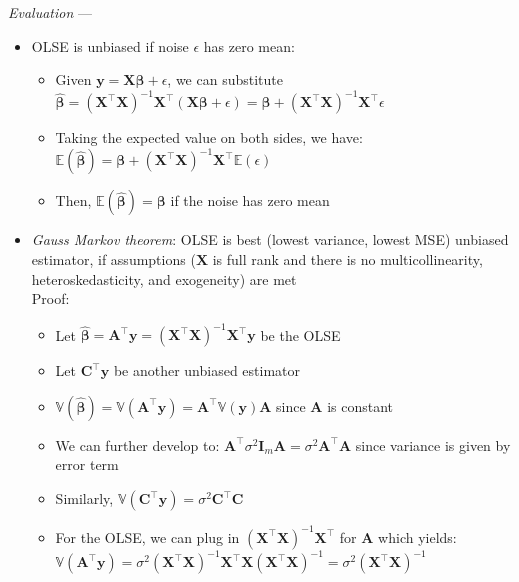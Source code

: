 \emph{Evaluation} ---
\begin{itemize}
    \item OLSE is unbiased if noise $\epsilon$ has zero mean:
    \begin{itemize}
        \item Given $\boldsymbol{y} = \boldsymbol{X}\boldsymbol{\beta} + \epsilon$, we can substitute $\boldsymbol{\hat{\beta}} = (\boldsymbol{X}^\intercal \boldsymbol{X})^{-1}  \boldsymbol{X}^\intercal (\boldsymbol{X}\boldsymbol{\beta} + \epsilon) = \boldsymbol{\beta} + (\boldsymbol{X}^\intercal \boldsymbol{X})^{-1}  \boldsymbol{X}^\intercal \epsilon$
        \item Taking the expected value on both sides, we have: $\mathbb{E}(\boldsymbol{\hat{\beta}}) = \boldsymbol{\beta} + (\boldsymbol{X}^\intercal \boldsymbol{X})^{-1}  \boldsymbol{X}^\intercal \mathbb{E}(\epsilon)$
        \item Then, $\mathbb{E}(\boldsymbol{\hat{\beta}}) = \boldsymbol{\beta}$ if the noise has zero mean
    \end{itemize}
    \item \emph{Gauss Markov theorem}: OLSE is best (lowest variance, lowest MSE) unbiased estimator, if assumptions ($\boldsymbol{X}$ is full rank and there is no multicollinearity, heteroskedasticity, and exogeneity) are met\\
    Proof:
    \begin{itemize}
        \item Let $\hat{\boldsymbol{\beta}} = \boldsymbol{A}^\intercal \boldsymbol{y} = (\boldsymbol{X}^\intercal \boldsymbol{X})^{-1}  \boldsymbol{X}^\intercal \boldsymbol{y}$ be the OLSE
        \item Let $\boldsymbol{C}^\intercal \boldsymbol{y}$ be another unbiased estimator
        \item $\mathbb{V}(\hat{\boldsymbol{\beta}}) = \mathbb{V}(\boldsymbol{A}^\intercal \boldsymbol{y}) = \boldsymbol{A}^\intercal \mathbb{V}(\boldsymbol{y}) \boldsymbol{A}$ since $\boldsymbol{A}$ is constant
        \item We can further develop to: $\boldsymbol{A}^\intercal \sigma^2 \boldsymbol{I}_m \boldsymbol{A} = \sigma^2 \boldsymbol{A}^\intercal \boldsymbol{A}$ since variance is given by error term
        \item Similarly, $\mathbb{V}(\boldsymbol{C}^\intercal \boldsymbol{y}) = \sigma^2 \boldsymbol{C}^\intercal \boldsymbol{C} $
        \item For the OLSE, we can plug in $(\boldsymbol{X}^\intercal \boldsymbol{X})^{-1}  \boldsymbol{X}^\intercal$ for $\boldsymbol{A}$ which yields: $\mathbb{V}(\boldsymbol{A}^\intercal \boldsymbol{y}) = \sigma^2 (\boldsymbol{X}^\intercal \boldsymbol{X})^{-1}  \boldsymbol{X}^\intercal \boldsymbol{X} (\boldsymbol{X}^\intercal \boldsymbol{X})^{-1} = \sigma^2 (\boldsymbol{X}^\intercal \boldsymbol{X})^{-1}$ 

\end{itemize}
\end{itemize}
